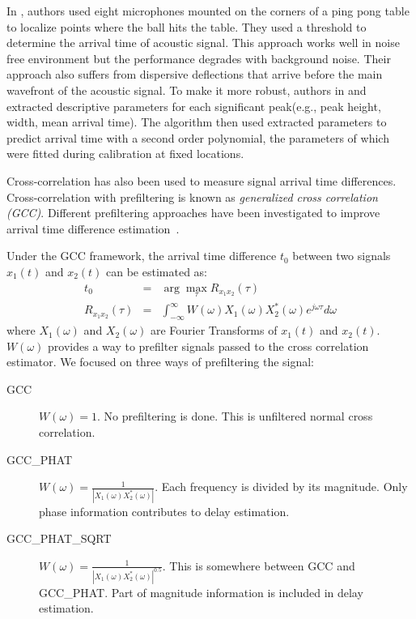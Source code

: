 In \cite{tdoa:ppp}, authors used eight microphones mounted on the corners of a ping pong table to localize points where the ball hits the table. They used a threshold to determine the arrival time of acoustic signal. This approach works well in noise free environment but the performance degrades with background noise. Their approach also suffers from dispersive deflections that arrive before the main wavefront of the acoustic signal. To make it more robust, authors in \cite{tdoa:mit3} and \cite{tdoa:mit4} extracted descriptive parameters for each significant peak(e.g., peak height, width, mean arrival time). The algorithm then used extracted parameters to predict arrival time with a second order polynomial, the parameters of which were fitted during calibration at fixed locations.

Cross-correlation has also been used to measure signal arrival time differences\cite{tdoa:mit2, tdoa:micloc, tdoa:3}. Cross-correlation with prefiltering is known as \emph{generalized cross correlation (GCC)}. Different prefiltering approaches have been investigated to improve arrival time difference estimation~\cite{tdoa:gcc1,tdoa:gcc2,tdoa:gcc3}.

Under the GCC framework, the arrival time difference $t_0$ between two signals $x_1(t)$ and $x_2(t)$ can be estimated as:
\begin{eqnarray} \label{eq:gcc}
t_0 &=& \arg\max_{\tau} R_{x_1x_2}(\tau) \\\label{eq:gcc2}
R_{x_1x_2}(\tau) &=& \int_{-\infty}^\infty W(\omega) X_1(\omega) X_2^{*}(\omega) e^{j\omega\tau} d\omega
\end{eqnarray}
where $X_1(\omega)$ and $X_2(\omega)$ are Fourier Transforms of $x_1(t)$ and $x_2(t)$. $W(\omega)$ provides a way to prefilter signals passed to the cross correlation estimator. We focused on three ways of prefiltering the signal:
\begin{description}%
\item[GCC] $W(\omega) = 1$. No prefiltering is done. This is unfiltered normal cross correlation.
\item[GCC\_PHAT] $W(\omega) = \frac{1}{\left|X_1(\omega)X_2^{*}(\omega)\right|}$. Each frequency is divided by its magnitude. Only phase information contributes to delay estimation.
\item[GCC\_PHAT\_SQRT] $W(\omega) = \frac{1}{\left|X_1(\omega)X_2^*(\omega)\right|^{0.5}}$. This is somewhere between GCC and GCC\_PHAT. Part of magnitude information is included in delay estimation.
\end{description}
